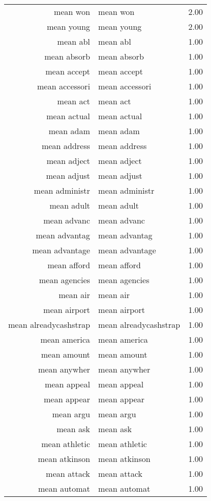 \begin{table}[ht]
\begin{tabular}{rlr}
  mean won & mean won & 2.00 \\ 
  mean young & mean young & 2.00 \\ 
  mean abl & mean abl & 1.00 \\ 
  mean absorb & mean absorb & 1.00 \\ 
  mean accept & mean accept & 1.00 \\ 
  mean accessori & mean accessori & 1.00 \\ 
  mean act & mean act & 1.00 \\ 
  mean actual & mean actual & 1.00 \\ 
  mean adam & mean adam & 1.00 \\ 
  mean address & mean address & 1.00 \\ 
  mean adject & mean adject & 1.00 \\ 
  mean adjust & mean adjust & 1.00 \\ 
  mean administr & mean administr & 1.00 \\ 
  mean adult & mean adult & 1.00 \\ 
  mean advanc & mean advanc & 1.00 \\ 
  mean advantag & mean advantag & 1.00 \\ 
  mean advantage & mean advantage & 1.00 \\ 
  mean afford & mean afford & 1.00 \\ 
  mean agencies & mean agencies & 1.00 \\ 
  mean air & mean air & 1.00 \\ 
  mean airport & mean airport & 1.00 \\ 
  mean alreadycashstrap & mean alreadycashstrap & 1.00 \\ 
  mean america & mean america & 1.00 \\ 
  mean amount & mean amount & 1.00 \\ 
  mean anywher & mean anywher & 1.00 \\ 
  mean appeal & mean appeal & 1.00 \\ 
  mean appear & mean appear & 1.00 \\ 
  mean argu & mean argu & 1.00 \\ 
  mean ask & mean ask & 1.00 \\ 
  mean athletic & mean athletic & 1.00 \\ 
  mean atkinson & mean atkinson & 1.00 \\ 
  mean attack & mean attack & 1.00 \\ 
  mean automat & mean automat & 1.00 \\ 

\end{tabular}
\end{table}
